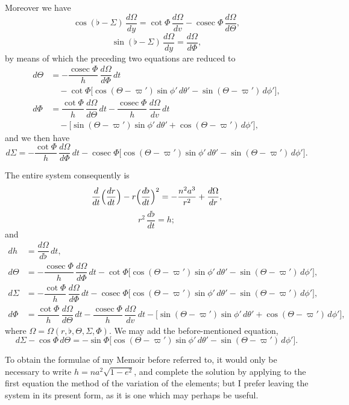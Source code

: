 \documentclass[12pt,a4paper]{article}
\providecommand{\cosec}{\mathop{\mathrm{cosec}}}
\theoremstyle{plain}
\begin{document}
Moreover we have
\[
\cos(\flat-\varSigma)\,\dfrac{d\Omega}{dy}=\cot\varPhi\,\dfrac{d\Omega}{dv}-\cosec\varPhi\,\dfrac{d\Omega}{d\Theta},
\]
\[
\sin(\flat-\varSigma)\,\dfrac{d\Omega}{dy}=\dfrac{d\Omega}{d\varPhi},
\]
by means of which the preceding two equations are reduced to
\begin{align*}
d\Theta &= -\dfrac{\cosec\varPhi}{h}\,\dfrac{d\Omega}{d\varPhi}\,dt\\
&\quad -\cot\varPhi\bigl[\cos(\Theta-\varpi')\sin\phi'\,d\theta'-\sin(\Theta-\varpi')\,d\phi'\bigr],\\[0.4em]
d\varPhi &= \dfrac{\cot\varPhi}{h}\,\dfrac{d\Omega}{d\Theta}\,dt-\dfrac{\cosec\varPhi}{h}\,\dfrac{d\Omega}{dv}\,dt\\
&\quad -\bigl[\sin(\Theta-\varpi')\sin\phi'\,d\theta'+\cos(\Theta-\varpi')\,d\phi'\bigr],
\end{align*}
and we then have
\[
d\varSigma=-\dfrac{\cot\varPhi}{h}\,\dfrac{d\Omega}{d\varPhi}\,dt-\cosec\varPhi\bigl[\cos(\Theta-\varpi')\sin\phi'\,d\theta'-\sin(\Theta-\varpi')\,d\phi'\bigr].
\]

\newpage
{} The entire system consequently is
\[
\dfrac{d}{dt}\Bigl(\dfrac{dr}{dt}\Bigr)-r\Bigl(\dfrac{d\flat}{dt}\Bigr)^{2}=-\dfrac{n^{2}a^{3}}{r^{2}}+\dfrac{d\Omega}{dr},
\]
\[
r^{2}\,\dfrac{d\flat}{dt}=h;
\]
and
\begin{align*}
dh &= \dfrac{d\Omega}{d\flat}\,dt,\\[0.3em]
d\Theta &= -\dfrac{\cosec\varPhi}{h}\,\dfrac{d\Omega}{d\varPhi}\,dt-\cot\varPhi\bigl[\cos(\Theta-\varpi')\sin\phi'\,d\theta'-\sin(\Theta-\varpi')\,d\phi'\bigr],\\[0.3em]
d\varSigma &= -\dfrac{\cot\varPhi}{h}\,\dfrac{d\Omega}{d\varPhi}\,dt-\cosec\varPhi\bigl[\cos(\Theta-\varpi')\sin\phi'\,d\theta'-\sin(\Theta-\varpi')\,d\phi'\bigr],\\[0.3em]
d\varPhi &= \dfrac{\cot\varPhi}{h}\,\dfrac{d\Omega}{d\Theta}\,dt-\dfrac{\cosec\varPhi}{h}\,\dfrac{d\Omega}{dv}\,dt-\bigl[\sin(\Theta-\varpi')\sin\phi'\,d\theta'+\cos(\Theta-\varpi')\,d\phi'\bigr],
\end{align*}
where $\Omega=\Omega(r,\flat,\Theta,\varSigma,\varPhi)$. We may add the before-mentioned equation,
\[
d\varSigma-\cos\varPhi\,d\Theta=-\sin\varPhi\bigl[\cos(\Theta-\varpi')\sin\phi'\,d\theta'-\sin(\Theta-\varpi')\,d\phi'\bigr].
\]

\medskip
To obtain the formulae of my Memoir before referred to, it would only be necessary to write $h=na^{2}\sqrt{1-e^{2}}$, and complete the solution by applying to the first equation the method of the variation of the elements; but I prefer leaving the system in its present form, as it is one which may perhaps be useful.
\end{document}
